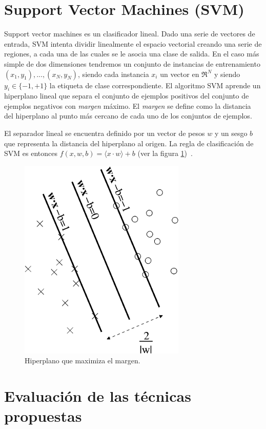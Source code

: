 \documentclass[runningheads,a4paper]{llncs}
\begin{document}
\section{Support Vector Machines (SVM)}
\label{sec:SVM}

Support vector machines\cite{JOACHIMS99} es un clasificador lineal. Dado una serie de vectores de entrada, SVM intenta dividir linealmente el espacio vectorial creando una serie de regiones, a cada una de las cuales se le asocia una clase de salida. En el caso más simple de dos dimensiones tendremos un conjunto de instancias de entrenamiento ${(x_1, y_1),...,(x_N,y_N)}$, siendo cada instancia $x_i$ un vector en $\Re^N$ y siendo $y_i \in \lbrace-1,+1\rbrace$ la etiqueta de clase correspondiente. El algoritmo SVM aprende un hiperplano lineal que separa el conjunto de ejemplos positivos del conjunto de ejemplos negativos con \emph{margen} máximo. El \emph{margen} se define como la distancia del hiperplano al punto más cercano de cada uno de los conjuntos de ejemplos.

El separador lineal se encuentra definido por un vector de pesos $w$ y un sesgo $b$ que representa la distancia del hiperplano al origen. La regla de clasificación de SVM es entonces $f(x,w,b)=\langle x \cdot w \rangle+b$ (ver la figura \ref{fig:SVM})~\cite{MATA07}.

\begin{figure}[ht]
	\centering
	\includegraphics[scale=0.6]{svm.png}
	\caption{Hiperplano que maximiza el margen.}
	\label{fig:SVM}
\end{figure}

\section{Evaluación de las técnicas propuestas}
\label{sec:Resultados}
\end{document}
